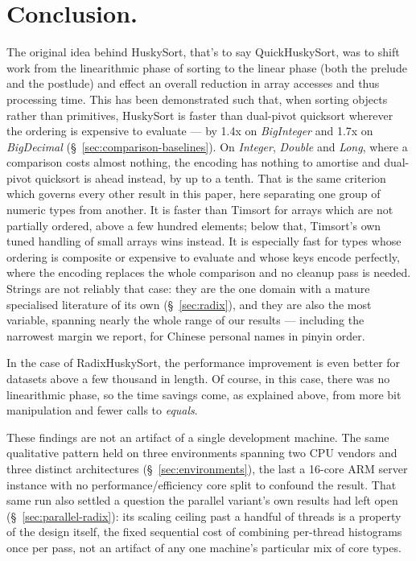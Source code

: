 \documentclass[twoside,leqno,twocolumn]{article}
\begin{document}
\section{Conclusion.}

The original idea behind HuskySort, that's to say QuickHuskySort,
was to shift work from the linearithmic phase of sorting to the linear phase (both the prelude and the postlude)
and effect an overall reduction in array accesses and thus processing time.
\label{sec:conclusion-dp}%
This has been demonstrated such that, when sorting objects rather than primitives,
HuskySort is faster than dual-pivot quicksort wherever the ordering is expensive to evaluate ---
by 1.4x on \textit{BigInteger} and 1.7x on \textit{BigDecimal} (\S~\ref{sec:comparison-baselines}).
On \textit{Integer}, \textit{Double} and \textit{Long}, where a comparison costs almost nothing,
the encoding has nothing to amortise and dual-pivot quicksort is ahead instead, by up to a tenth.
That is the same criterion which governs every other result in this paper,
here separating one group of numeric types from another.
It is faster than Timsort for arrays which are not partially ordered, above a few hundred elements;
below that, Timsort's own tuned handling of small arrays wins instead.
It is especially fast for types whose ordering is composite or expensive to evaluate
and whose keys encode perfectly, where the encoding replaces the whole comparison and no cleanup pass is needed.
Strings are not reliably that case:
they are the one domain with a mature specialised literature of its own (\S~\ref{sec:radix}),
and they are also the most variable, spanning nearly the whole range of our results ---
including the narrowest margin we report, for Chinese personal names in pinyin order.

In the case of RadixHuskySort, the performance improvement is even better for datasets above a few thousand in length.
Of course, in this case, there was no linearithmic phase, so the time savings come, as explained above,
from more bit manipulation and fewer calls to \textit{equals}.

These findings are not an artifact of a single development machine.
The same qualitative pattern held on three environments spanning two CPU vendors and three distinct architectures
(\S~\ref{sec:environments}),
the last a 16-core ARM server instance with no performance/efficiency core split to confound the result.
That same run also settled a question the parallel variant's own results had left open (\S~\ref{sec:parallel-radix}):
its scaling ceiling past a handful of threads is a property of the design itself,
the fixed sequential cost of combining per-thread histograms once per pass,
not an artifact of any one machine's particular mix of core types.
\end{document}
